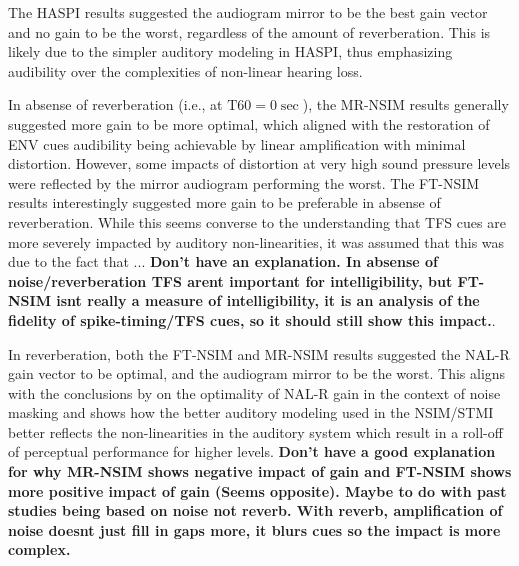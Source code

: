 The HASPI results suggested the audiogram mirror to be the best gain vector and no gain to be the worst, regardless of the amount of reverberation. This is likely due to the simpler auditory modeling in HASPI, thus emphasizing audibility over the complexities of non-linear hearing loss. 

In absense of reverberation (i.e., at $\mathrm{T60} = 0 \unit{\sec}$), the MR-NSIM results generally suggested more gain to be more optimal, which aligned with the restoration of ENV cues audibility being achievable by linear amplification with minimal distortion. However, some impacts of distortion at very high sound pressure levels were reflected by the mirror audiogram performing the worst. The FT-NSIM results interestingly suggested more gain to be preferable in absense of reverberation. While this seems converse to the understanding that TFS cues are more severely impacted by auditory non-linearities, it was assumed that this was due to the fact that ... \textbf{Don't have an explanation. In absense of noise/reverberation TFS arent important for intelligibility, but FT-NSIM isnt really a measure of intelligibility, it is an analysis of the fidelity of spike-timing/TFS cues, so it should still show this impact.}. 

In reverberation, both the FT-NSIM and MR-NSIM results suggested the NAL-R gain vector to be optimal, and the audiogram mirror to be the worst. This aligns with the conclusions by \cite{byrne1986national} on the optimality of NAL-R gain in the context of noise masking and shows how the better auditory modeling used in the NSIM/STMI better reflects the non-linearities in the auditory system which result in a roll-off of perceptual performance for higher levels. \textbf{Don't have a good explanation for why MR-NSIM shows negative impact of gain and FT-NSIM shows more positive impact of gain (Seems opposite). Maybe to do with past studies being based on noise not reverb. With reverb, amplification of noise doesnt just fill in gaps more, it blurs cues so the impact is more complex.}


